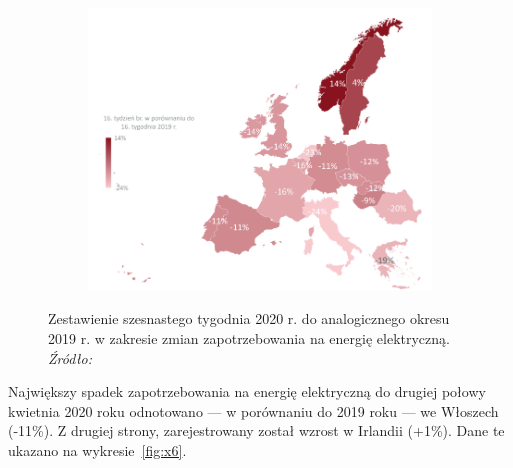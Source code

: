 \documentclass[polish, twoside, 12pt, a4paper]{article}
\theoremstyle{definition}
\theoremstyle{plain}
\theoremstyle{remark}
\begin{document}
\begin{figure}[hbt]
  \centering

  \begin{subfigure}[t]{0.45\textwidth}
    \hspace{-1.8cm}
    \includegraphics[width=1.4\textwidth]{./out_figures/figure_5}
  \end{subfigure}

  \captionsetup{margin=10pt,font=small,labelfont=bf,width=.8\textwidth}

  \caption[Zmiany zapotrzebowania na energię elektryczną (1 tydzień)]{ Zestawienie szesnastego tygodnia 2020 r. do analogicznego okresu 2019 r. w zakresie zmian zapotrzebowania na energię elektryczną. \textit{Źródło:} \cite{biuroanalizpfr2020}}\label{fig:x5}
\end{figure}

Największy spadek zapotrzebowania na energię elektryczną do drugiej połowy kwietnia 2020 roku odnotowano --- w porównaniu do 2019 roku --- we Włoszech (-11\%). Z drugiej strony, zarejestrowany został wzrost w Irlandii (+1\%). Dane te ukazano na wykresie~\ref{fig:x6}. 
\end{document}
